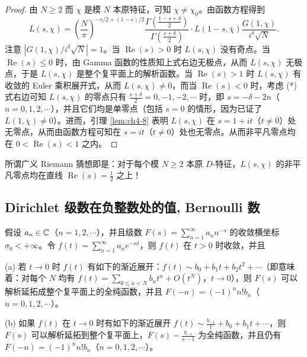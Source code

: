 \begin{proof}
由 $N\geqslant 2$ 而 $\chi$ 是模 $N$ 本原特征，可知 $\chi\neq\chi_0$。由函数方程得到
\begin{equation}\tag{*}
  L(s,\chi)=\left(\frac{N}{\pi}\right)^{-s/2+(1-s)/2}\frac{\Gamma\left(\frac{1-s+\delta}{2}\right)}{\Gamma\left(\frac{s+\delta}{2}\right)}
  \cdot L(1-s,\overline{\chi})\frac{G(1,\chi)}{i^{\delta}\sqrt{N}}.
\end{equation}
注意 $|G(1,\chi)/i^{\delta}\sqrt{N}|=1$。当 $\operatorname{Re}(s)>0$ 时 $L(s,\chi)$ 没有奇点。当 $\operatorname{Re}(s)\leqslant 0$ 时，由 Gamma 函数的性质知上式右边无极点，从而 $L(s,\chi)$ 无极点，于是 $L(s,\chi)$ 是整个复平面上的解析函数。当 $\operatorname{Re}(s)>1$ 时 $L(s,\chi)$ 有收敛的 Euler 乘积展开式，从而 $L(s,\chi)\neq 0$，而当 $\operatorname{Re}(s)<0$ 时，考虑 (*) 式右边可知 $L(s,\chi)$ 的零点只有 $\frac{s+\delta}{2}=0,-1,-2,\cdots$ 时，即 $s=-\delta-2n$（$n=0,1,2,\cdots$），并且它们均是单零点（包括 $s=0$ 的情形，因为已证了 $L(1,\overline{\chi})\neq 0$）。进而，引理 \ref{lem:ch4-8} 表明 $L(s,\chi)$ 在 $s=1+it$（$t\neq 0$）处无零点，从而由函数方程可知在 $s=it$（$t\neq 0$）处也无零点。从而非平凡零点均在 $0<\operatorname{Re}(s)<1$ 之内。
\end{proof}

\begin{remark}
所谓广义 Riemann 猜想即是：对于每个模 $N\geqslant 2$ 本原 $D$-特征，$L(s,\chi)$ 的非平凡零点均在直线 $\operatorname{Re}(s)=\frac{1}{2}$ 之上！
\end{remark}

\subsection{Dirichlet 级数在负整数处的值, Bernoulli 数}\label{sec:ch4-s2-4}

\begin{theorem}\label{thm:4.9}
假设 $a_n\in\mathbb{C}$（$n=1,2,\cdots$），并且级数 $F(s)=\sum_{n=1}^{\infty}a_nn^{-s}$ 的收敛横坐标 $\sigma_0<+\infty$。令 $f(t)=\sum_{n=1}^{\infty}a_ne^{-nt}$，则 $f(t)$ 在 $t>0$ 时收敛，并且

(a) 若 $t\to0$ 时 $f(t)$ 有如下的渐近展开：$f(t)\sim b_0+b_1t+b_2t^2+\cdots$（即意味着：对每个 $N$ 均有 $f(t)=\sum_{0\leqslant n<N}b_nt^n+O(t^N)$，$t\to0$），则 $F(s)$ 可以解析延拓成整个复平面上的全纯函数，并且 $F(-n)=(-1)^nn!b_n$（$n=0,1,2,\cdots$）。

(b) 如果 $f(t)$ 在 $t\to0$ 时有如下的渐近展开 $f(t)\sim\frac{b_{-1}}{t}+b_0+b_1t+\cdots$，则 $F(s)$ 可以解析延拓到整个复平面上，$F(s)-\frac{b_{-1}}{s-1}$ 为全纯函数，并且仍有 $F(-n)=(-1)^nn!b_n$（$n=0,1,2,\cdots$）。
\end{theorem}

